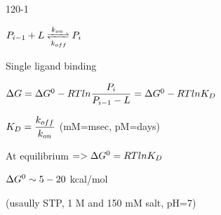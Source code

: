 \begin{mitframe}{120-1}
\begin{listone}
	\item $\p_{\state-1}+\length\xrightleftharpoons[\thermcond_{off}]{\thermcond_{on}}\p_{\state}$
    \item Single ligand binding
    \item $\iipf\gibbs=\iipf\gibbs^{\init}-\gasconst\Temp{ln}\dfrac{\p_{\state}}{\p_{\state-1}-\length}=\iipf\gibbs^{\init}-\gasconst\Temp{ln}\dilfac_{\elecdisplace}$
    	\begin{listtwo}
    		\item $\dilfac_{\elecdisplace}=\dfrac{\thermcond_{off}}{\thermcond_{on}}$ (mM=msec, pM=days)
    \item At equilibrium $=>\iipf\gibbs^{\init}=\gasconst\Temp{ln}\dilfac_{\elecdisplace}$
    		\item $\iipf\gibbs^{\init}\sim{5}-20$ kcal/mol
    		\item (usaully STP, 1 M and 150 mM salt, pH=7)
            
            \end{listtwo}
\end{listone}
\end{mitframe}